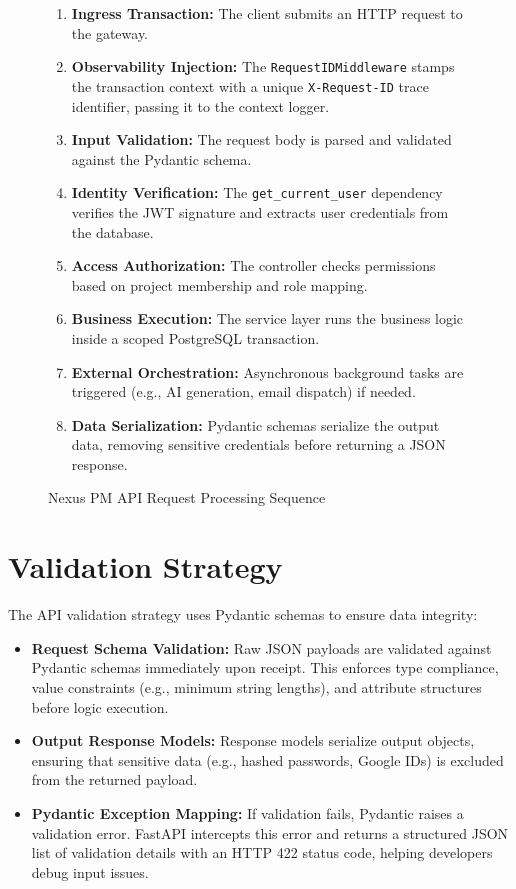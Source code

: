 \begin{figure}[h!]
    \centering
    \begin{minipage}{0.75\textwidth}
    \small
    \begin{enumerate}
        \item \textbf{Ingress Transaction:} The client submits an HTTP request to the gateway.
        \item \textbf{Observability Injection:} The \texttt{RequestIDMiddleware} stamps the transaction context with a unique \texttt{X-Request-ID} trace identifier, passing it to the context logger.
        \item \textbf{Input Validation:} The request body is parsed and validated against the Pydantic schema.
        \item \textbf{Identity Verification:} The \texttt{get\_current\_user} dependency verifies the JWT signature and extracts user credentials from the database.
        \item \textbf{Access Authorization:} The controller checks permissions based on project membership and role mapping.
        \item \textbf{Business Execution:} The service layer runs the business logic inside a scoped PostgreSQL transaction.
        \item \textbf{External Orchestration:} Asynchronous background tasks are triggered (e.g., AI generation, email dispatch) if needed.
        \item \textbf{Data Serialization:} Pydantic schemas serialize the output data, removing sensitive credentials before returning a JSON response.
    \end{enumerate}
    \end{minipage}
    \caption{Nexus PM API Request Processing Sequence}
    \label{fig:request_pipeline}
\end{figure}

\section{Validation Strategy}
The API validation strategy uses Pydantic schemas to ensure data integrity:
\begin{itemize}
    \item \textbf{Request Schema Validation:} Raw JSON payloads are validated against Pydantic schemas immediately upon receipt. This enforces type compliance, value constraints (e.g., minimum string lengths), and attribute structures before logic execution.
    \item \textbf{Output Response Models:} Response models serialize output objects, ensuring that sensitive data (e.g., hashed passwords, Google IDs) is excluded from the returned payload.
    \item \textbf{Pydantic Exception Mapping:} If validation fails, Pydantic raises a validation error. FastAPI intercepts this error and returns a structured JSON list of validation details with an HTTP 422 status code, helping developers debug input issues.
\end{itemize}

